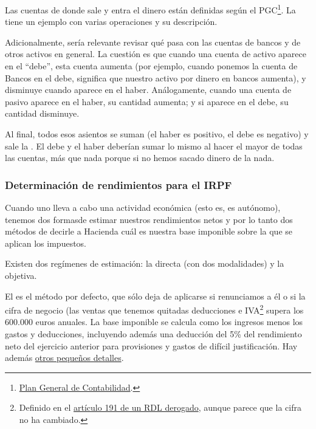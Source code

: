 \documentclass[nochap,palatino,shortheader]{apuntes}
\begin{document}
Las cuentas de donde sale y entra el dinero están definidas según el PGC\footnote{\href{https://www.boe.es/boe/dias/2007/11/20/pdfs/C00001-00152.pdf}{Plan General de Contabilidad}.}. La  tiene un ejemplo con varias operaciones y su descripción.

Adicionalmente, sería relevante revisar qué pasa con las cuentas de bancos y de otros activos en general. La cuestión es que cuando una cuenta de activo aparece en el ``debe'', esta cuenta aumenta (por ejemplo, cuando ponemos la cuenta de Bancos en el debe, significa que nuestro activo por dinero en bancos aumenta), y disminuye cuando aparece en el haber. Análogamente, cuando una cuenta de pasivo aparece en el haber, su cantidad aumenta; y si aparece en el debe, su cantidad disminuye.

Al final, todos esos asientos se suman (el haber es positivo, el debe es negativo) y sale la . El debe y el haber deberían sumar lo mismo al hacer el mayor de todas las cuentas, más que nada porque si no hemos sacado dinero de la nada.

\subsubsection{Determinación de rendimientos para el IRPF}

Cuando uno lleva a cabo una actividad económica (esto es, es autónomo), tenemos dos formas\footnotemark de estimar nuestros rendimientos netos y por lo tanto dos métodos de decirle a Hacienda cuál es nuestra base imponible sobre la que se aplican los impuestos.


Existen dos regímenes de estimación: la directa (con dos modalidades) y la objetiva.

El  es el método por defecto, que sólo deja de aplicarse si renunciamos a él o si la cifra de negocio (las ventas que tenemos quitadas deducciones e IVA\footnote{Definido en el \href{http://www.boe.es/buscar/doc.php?id=BOE-A-1989-30361}{artículo 191 de un RDL derogado}, aunque parece que la cifra no ha cambiado.} supera los 600.000 euros anuales. La base imponible se calcula como los ingresos menos los gastos y deducciones, incluyendo además una deducción del 5\% del rendimiento neto del ejercicio anterior para provisiones y gastos de difícil justificación. Hay además \href{http://portal.circe.es/es-ES/emprendedor/EmpresarioIndividual/TributacionAutonomos/Paginas/AutonomoEstimacionDirectaSimplificada.aspx}{otros pequeños detalles}.
\end{document}

